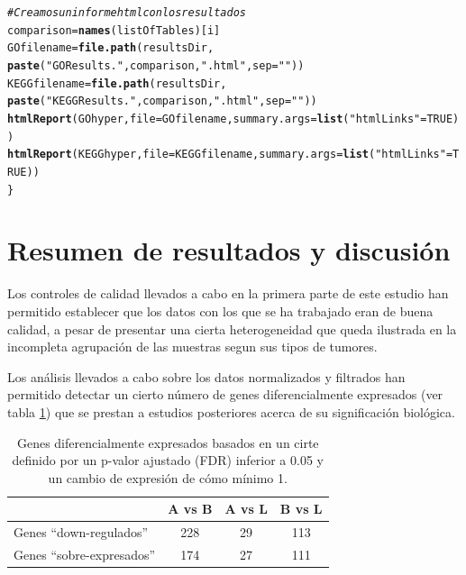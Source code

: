\documentclass[a4paper]{article}\usepackage[]{graphicx}\usepackage[]{color}
\makeatletter
\newcommand{\hlnum}[1]{\textcolor[rgb]{0.686,0.059,0.569}{#1}}%
\newcommand{\hlstr}[1]{\textcolor[rgb]{0.192,0.494,0.8}{#1}}%
\newcommand{\hlcom}[1]{\textcolor[rgb]{0.678,0.584,0.686}{\textit{#1}}}%
\newcommand{\hlstd}[1]{\textcolor[rgb]{0.345,0.345,0.345}{#1}}%
\newcommand{\hlkwb}[1]{\textcolor[rgb]{0.69,0.353,0.396}{#1}}%
\newcommand{\hlkwc}[1]{\textcolor[rgb]{0.333,0.667,0.333}{#1}}%
\newcommand{\hlkwd}[1]{\textcolor[rgb]{0.737,0.353,0.396}{\textbf{#1}}}%
\newenvironment{kframe}{%
 \def\at@end@of@kframe{}%
 \ifinner\ifhmode%
  \def\at@end@of@kframe{\end{minipage}}%
  \begin{minipage}{\columnwidth}%
 \fi\fi%
 \def\FrameCommand##1{\hskip\@totalleftmargin \hskip-\fboxsep
 \colorbox{shadecolor}{##1}\hskip-\fboxsep
     \hskip-\linewidth \hskip-\@totalleftmargin \hskip\columnwidth}%
 \MakeFramed {\advance\hsize-\width
   \@totalleftmargin\z@ \linewidth\hsize
   \@setminipage}}%
 {\par\unskip\endMakeFramed%
 \at@end@of@kframe}
\newenvironment{knitrout}{}{} %
\makeatother
\begin{document}
\begin{knitrout}
\begin{kframe}
\begin{alltt}
\hlcom{# Creamos un informe html con los resultados}
   \hlstd{comparison} \hlkwb{=} \hlkwd{names}\hlstd{(listOfTables)[i]}
   \hlstd{GOfilename} \hlkwb{=}\hlkwd{file.path}\hlstd{(resultsDir,}
     \hlkwd{paste}\hlstd{(}\hlstr{"GOResults."}\hlstd{,comparison,}\hlstr{".html"}\hlstd{,} \hlkwc{sep}\hlstd{=}\hlstr{""}\hlstd{))}
   \hlstd{KEGGfilename} \hlkwb{=}\hlkwd{file.path}\hlstd{(resultsDir,}
     \hlkwd{paste}\hlstd{(}\hlstr{"KEGGResults."}\hlstd{,comparison,}\hlstr{".html"}\hlstd{,} \hlkwc{sep}\hlstd{=}\hlstr{""}\hlstd{))}
  \hlkwd{htmlReport}\hlstd{(GOhyper,} \hlkwc{file} \hlstd{= GOfilename,} \hlkwc{summary.args}\hlstd{=}\hlkwd{list}\hlstd{(}\hlstr{"htmlLinks"}\hlstd{=}\hlnum{TRUE}\hlstd{))}
  \hlkwd{htmlReport}\hlstd{(KEGGhyper,} \hlkwc{file} \hlstd{= KEGGfilename,} \hlkwc{summary.args}\hlstd{=}\hlkwd{list}\hlstd{(}\hlstr{"htmlLinks"}\hlstd{=}\hlnum{TRUE}\hlstd{))}
\hlstd{\}}
\end{alltt}


{\ttfamily\noindent\bfseries{}}\end{kframe}
\end{knitrout}

\section{Resumen de resultados y discusión}

Los controles de calidad llevados a cabo en la primera parte de  este estudio han permitido establecer que los datos con los que se ha trabajado eran de buena calidad, a pesar de presentar una cierta heterogeneidad que queda ilustrada en la incompleta agrupación de las muestras segun sus tipos de tumores.

Los análisis llevados a cabo sobre los datos normalizados y filtrados han permitido detectar un cierto número de genes diferencialmente expresados (ver tabla \ref{resum1}) que se prestan a estudios posteriores acerca de su significación biológica.

\begin{table}[htbp]
\caption{Genes diferencialmente expresados basados en un cirte definido por un p-valor ajustado (FDR) inferior a 0.05 y un cambio de expresión de cómo mínimo 1.}
\begin{tabular}{|l|c|c|c|}
\hline
 & A vs B & A vs L & B vs L \\ \hline
Genes “down-regulados” & 228 & 29 & 113 \\ \hline
Genes “sobre-expresados” & 174 & 27 & 111 \\ \hline
\end{tabular}
\label{resum1}
\end{table}
\end{document}
